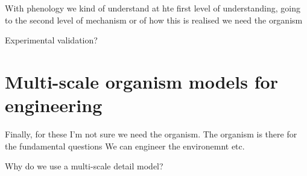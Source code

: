 \documentclass[phd]{infthesis}
\begin{document}
With phenology we kind of understand at hte first level of understanding, going
to the second level of mechanism or of how this is realised we need the organism


Experimental validation?


\section{Multi-scale organism models for engineering}
Finally,
for these I'm not sure we need the organism. The organism is there for the
fundamental questions
We can engineer the environemnt etc.

Why do we use a multi-scale detail model?







\printbibliography[heading=bibintoc]
\end{document}
